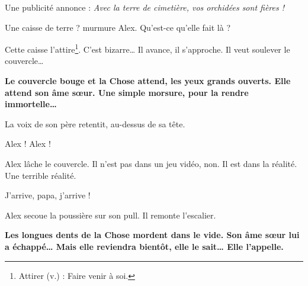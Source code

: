 Une publicité annonce : \emph{Avec la terre de cimetière, vos orchidées sont fières !}

\og Une caisse de terre ? murmure Alex. Qu'est-ce qu'elle fait là ? \fg{}

Cette caisse l'attire\footnote{Attirer (v.) : Faire venir à soi.}. C'est bizarre\ldots{} Il avance, il s'approche. Il veut
soulever le couvercle\ldots{}

\textbf{Le couvercle bouge et la Chose attend, les yeux grands ouverts. Elle attend son âme s\oe{}ur. Une simple morsure, pour la
rendre immortelle\ldots{}}

La voix de son père retentit, au-dessus de sa tête.

\og Alex ! Alex ! \fg{}

Alex lâche le couvercle. Il n'est pas dans un jeu vidéo, non. Il est dans la réalité. Une terrible réalité.

\og J'arrive, papa, j'arrive ! \fg{}

Alex secoue la poussière sur son pull. Il remonte l'escalier.

\textbf{Les longues dents de la Chose mordent dans le vide. Son âme s\oe{}ur lui a échappé\ldots{} Mais elle reviendra bientôt,
elle le sait\ldots{} Elle l'appelle.}
